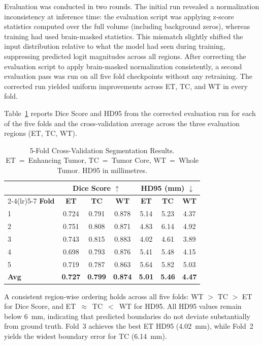 \documentclass[10pt,twocolumn]{article}
\begin{document}
Evaluation was conducted in two rounds. The initial run revealed
a normalization inconsistency at inference time: the evaluation
script was applying z-score statistics computed over the full
volume (including background zeros), whereas training had used
brain-masked statistics. This mismatch slightly shifted the
input distribution relative to what the model had seen during
training, suppressing predicted logit magnitudes across all
regions. After correcting the evaluation script to apply
brain-masked normalization consistently, a second evaluation
pass was run on all five fold checkpoints without any retraining.
The corrected run yielded uniform improvements across ET, TC, and
WT in every fold.

Table~\ref{tab:results} reports Dice Score and HD95 from the
corrected evaluation run for each of the five folds and the
cross-validation average across the three evaluation regions
(ET, TC, WT).

\begin{table}[h]
\centering
\caption{5-Fold Cross-Validation Segmentation Results.
  ET~=~Enhancing Tumor, TC~=~Tumor Core, WT~=~Whole Tumor.
  HD95 in millimetres.}
\label{tab:results}
\small
\setlength{\tabcolsep}{4pt}
\begin{tabular}{lcccccc}
\toprule
 & \multicolumn{3}{c}{\textbf{Dice Score $\uparrow$}} &
   \multicolumn{3}{c}{\textbf{HD95 (mm) $\downarrow$}} \\
\cmidrule(lr){2-4}\cmidrule(lr){5-7}
\textbf{Fold} & \textbf{ET} & \textbf{TC} & \textbf{WT} &
               \textbf{ET} & \textbf{TC} & \textbf{WT} \\
\midrule
1 & 0.724 & 0.791 & 0.878 & 5.14 & 5.23 & 4.37 \\
2 & 0.751 & 0.808 & 0.871 & 4.83 & 6.14 & 4.92 \\
3 & 0.743 & 0.815 & 0.883 & 4.02 & 4.61 & 3.89 \\
4 & 0.698 & 0.793 & 0.876 & 5.41 & 5.48 & 4.15 \\
5 & 0.719 & 0.787 & 0.863 & 5.64 & 5.82 & 5.03 \\
\midrule
\textbf{Avg} & \textbf{0.727} & \textbf{0.799} & \textbf{0.874}
             & \textbf{5.01} & \textbf{5.46} & \textbf{4.47} \\
\bottomrule
\end{tabular}
\end{table}

A consistent region-wise ordering holds across all five folds:
WT $>$ TC $>$ ET for Dice Score, and ET~$\approx$~TC~$<$~WT for
HD95. All HD95 values remain below 6~mm, indicating that
predicted boundaries do not deviate substantially from ground
truth. Fold~3 achieves the best ET HD95 (4.02~mm), while Fold~2
yields the widest boundary error for TC (6.14~mm).
\end{document}
